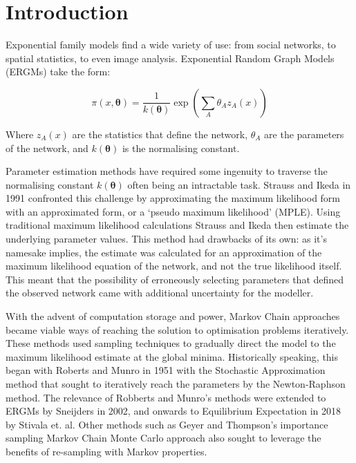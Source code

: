 \section{Introduction}
\label{introduction}

Exponential family models find a wide variety of use: from social networks, to spatial statistics, to even image analysis. Exponential Random Graph Models (ERGMs) take the form:

\begin{equation}
\label{eq:ergm_form}
\pi(x, \boldsymbol{\theta}) = \frac{1}{k(\boldsymbol{\theta})}\exp{\left(\sum_A{\theta_Az_A(x)}\right)}
\end{equation}

Where $z_A(x)$ are the statistics that define the network, $\theta_A$ are the parameters of the network, and $k(\boldsymbol{\theta})$ is the normalising constant. 

Parameter estimation methods have required some ingenuity to traverse the normalising constant $k(\boldsymbol{\theta})$ often being an intractable task. Strauss and Ikeda in 1991 confronted this challenge by approximating the maximum likelihood form with an approximated form, or a `pseudo maximum likelihood' (MPLE). Using traditional maximum likelihood calculations Strauss and Ikeda then estimate the underlying parameter values. This method had drawbacks of its own: as it's namesake implies, the estimate was calculated for an approximation of the maximum likelihood equation of the network, and not the true likelihood itself. This meant that the possibility of erroneously selecting parameters that defined the observed network came with additional uncertainty for the modeller. 

With the advent of computation storage and power, Markov Chain approaches became viable ways of reaching the solution to optimisation problems iteratively. These methods used sampling techniques to gradually direct the model to the maximum likelihood estimate at the global minima. Historically speaking, this began with Roberts and Munro in 1951 with the Stochastic Approximation method that sought to iteratively reach the parameters by the Newton-Raphson method. The relevance of Robberts and Munro's methods were extended to ERGMs by Sneijders in 2002, and onwards to Equilibrium Expectation in 2018 by Stivala et. al. Other methods such as Geyer and Thompson's importance sampling Markov Chain Monte Carlo approach also sought to leverage the benefits of re-sampling with Markov properties.


